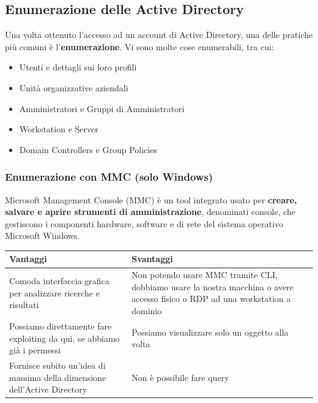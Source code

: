 \documentclass{article}
\begin{document}
\subsection{Enumerazione delle Active Directory}
Una volta ottenuto l'accesso ad un account di Active Directory, una delle pratiche più comuni è l'\textbf{enumerazione}. Vi sono molte cose enumerabili, tra cui:
\begin{itemize}
	\item Utenti e dettagli sui loro profili
	\item Unità organizzative aziendali
	\item Amministratori e Gruppi di Amministratori
	\item Workstation e Server
	\item Domain Controllers e Group Policies
\end{itemize}

\subsubsection{Enumerazione con MMC (solo Windows)}
Microsoft Management Console (MMC) è un tool integrato usato per \textbf{creare, salvare e aprire strumenti di amministrazione}, denominati console, che gestiscono i componenti hardware, software e di rete del sistema operativo Microsoft Windows.

\begin{table}[H]
\centering
\begin{tabular}{|m{7cm}|m{7cm}|}
	\hline
	\textbf{Vantaggi} & \textbf{Svantaggi} \\
	\hline
	Comoda interfaccia grafica per analizzare ricerche e
	risultati & Non potendo usare MMC tramite CLI, dobbiamo usare la
	nostra macchina o avere accesso fisico o RDP ad una
	workstation a dominio \\
	\hline
	Possiamo direttamente fare exploiting da qui, se abbiamo
	già i permessi & Possiamo visualizzare solo un oggetto alla volta \\
	\hline
	Fornisce subito un'idea di massima della dimensione
	dell'Active Directory & Non è possibile fare query \\
	\hline
\end{tabular}
\end{table}
\end{document}
